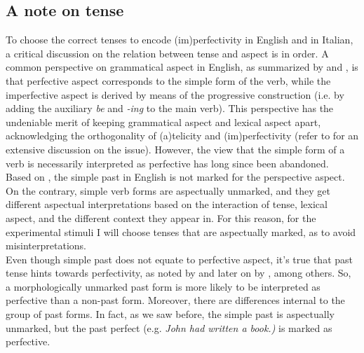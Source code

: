 \subsection{A note on tense}
To choose the correct tenses to encode (im)perfectivity in English and in Italian, a critical discussion on the relation between tense and aspect is in order. A common perspective on grammatical aspect in English, as summarized by \textcite[106]{smith1991parameter} and \textcite[663]{wagner2001aspectual}, is that perfective aspect corresponds to the simple form of the verb, while the imperfective aspect is derived by means of the progressive construction (i.e. by adding the auxiliary \textit{be} and \textit{-ing} to the main verb). This perspective has the undeniable merit of keeping grammatical aspect and lexical aspect apart, acknowledging the orthogonality of (a)telicity and (im)perfectivity (refer to \textcite{bertinetto2001frequent} for an extensive discussion on the issue). However, the view that the simple form of a verb is necessarily interpreted as perfective has long since been abandoned.\\
Based on \textcite{Olsen1997, bertinetto2001frequent}, the simple past in English is not marked for the perspective aspect. On the contrary, simple verb forms are aspectually unmarked, and they get different aspectual interpretations based on the interaction of tense, lexical aspect, and the different context they appear in. For this reason, for the experimental stimuli I will choose tenses that are aspectually marked, as to avoid misinterpretations.\\
Even though simple past does not equate to perfective aspect, it's true that past tense hints towards perfectivity, as noted by \textcite{comrie1976aspect} and later on by \textcite{wagner2001aspectual, Olsen1997, Medina2007}, among others. So, a morphologically unmarked past form is more likely to be interpreted as perfective than a non-past form. Moreover, there are differences internal to the group of past forms. In fact, as we saw before, the simple past is aspectually unmarked, but the past perfect (e.g. \textit{John had written a book.)} is marked as perfective.

